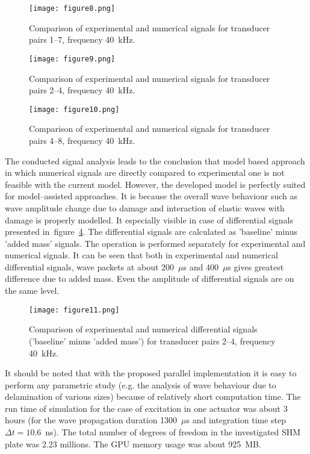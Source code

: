 \documentclass[12pt]{iopart}
\begin{document}
\begin{figure} [h!]
	\centering
	\texttt{[image: figure8.png]}	
	\caption{Comparison of experimental and numerical signals for transducer pairs 1--7, frequency 40~kHz.}
	\label{fig:path1_7}
\end{figure}
\begin{figure} [h!]
	\centering
	\texttt{[image: figure9.png]}	
	\caption{Comparison of experimental and numerical signals for transducer pairs 2--4, frequency 40~kHz.}
	\label{fig:path2_4}
\end{figure}
\begin{figure} [h!]
	\centering
	\texttt{[image: figure10.png]}	
	\caption{Comparison of experimental and numerical signals for transducer pairs 4--8, frequency 40~kHz.}
	\label{fig:path4_8}
\end{figure}
\clearpage
The conducted signal analysis leads to the conclusion that model based approach in which numerical signals are directly compared to experimental one is not feasible with the current model. However, the developed model is perfectly suited for model--assisted approaches. It is because the overall wave behaviour such as wave amplitude change due to damage and interaction of elastic waves with damage is properly modelled. It especially visible in case of differential signals presented in~figure~\ref{fig:path2_4_diff}. The differential signals are calculated as 'baseline' minus 'added mass' signals. The operation is performed separately for experimental and numerical signals. It can be seen that both in experimental and numerical differential signals, wave packets at about 200~\(\mu\)s and 400~\(\mu\)s gives greatest difference due to added mass. Even the amplitude of differential signals are on the same level.

\begin{figure} [h!]
	\centering
	\texttt{[image: figure11.png]}	
	\caption{Comparison of experimental and numerical differential signals ('baseline' minus 'added mass') for transducer pairs 2--4, frequency 40~kHz.}
	\label{fig:path2_4_diff}
\end{figure}

It should be noted that with the proposed parallel implementation it is easy to perform any parametric study (e.g. the analysis of wave behaviour due to delamination of various sizes) because of relatively short computation time. The run time of simulation for the case of excitation in one actuator was about 3 hours (for the wave propagation duration 1300~\(\mu\)s and integration time step \(\Delta t = 10.6\)~ns). The total number of degrees of freedom in the investigated SHM plate was 2.23 millions. The GPU memory usage was about 925~MB.
\end{document}
